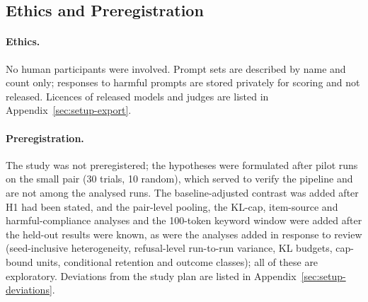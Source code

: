 \subsection{Ethics and Preregistration}
\label{sec:setup-ethics}

\paragraph{Ethics.} No human participants were involved.
Prompt sets are described by name and count only; responses to harmful prompts
are stored privately for scoring and not released. Licences of released
models and judges are listed in Appendix~\ref{sec:setup-export}.

\paragraph{Preregistration.} The study was not preregistered; the hypotheses
were formulated after pilot runs on the small pair (30 trials, 10 random),
which served to verify the pipeline and are not among the analysed runs. The
baseline-adjusted contrast was added after H1 had been stated, and the
pair-level pooling, the KL-cap, item-source and harmful-compliance analyses
and the 100-token keyword window were added after the held-out results were
known, as were the analyses added in response to review (seed-inclusive
heterogeneity, refusal-level run-to-run variance, KL budgets, cap-bound units,
conditional retention and outcome classes); all of these are exploratory.
Deviations from the study plan are listed in
Appendix~\ref{sec:setup-deviations}.

